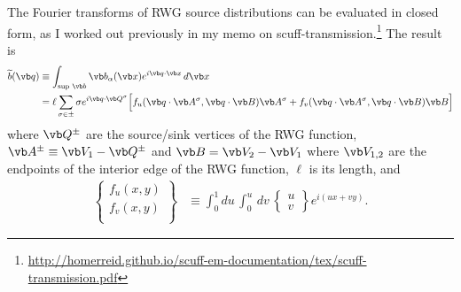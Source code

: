 \documentclass[letterpaper]{article}
\renewcommand{\wt}{\widetilde}
\begin{document}
The Fourier transforms of RWG source distributions can be evaluated
in closed form, as I worked out previously in my memo 
on {\sc scuff-transmission}.\footnote{\url{ http://homerreid.github.io/scuff-em-documentation/tex/scuff-transmission.pdf}}
The result is
\begin{align*}
 \wt{b}(\vb q)
&\equiv \int_{\text{sup }\vb b} \vb b_\alpha(\vb x) e^{i\vb q\cdot \vb x}\,d\vb x
\\
&=\ell\sum_{\sigma\in \pm}
  \sigma e^{i\vb q \cdot \vb Q^\sigma}
   \Big[  f_u(\vb q\cdot \vb A^\sigma, \vb q\cdot \vb B) \vb A^\sigma
         +f_v(\vb q\cdot \vb A^\sigma, \vb q\cdot \vb B) \vb B
   \Big]
\end{align*}
where $\vb Q^\pm$ are the source/sink vertices of the RWG function,
$\vb A^\pm\equiv \vb V_1-\vb Q^\pm$ and $\vb B=\vb V_2-\vb V_1$ 
where $\vb V_{1,2}$ are the endpoints of the interior edge
of the RWG function, $\ell$ is its length, and
\begin{align*}
 \left\{\begin{array}{c}
 f_u(x,y) \\[3pt]
 f_v(x,y) \\
 \end{array}\right\}
&\equiv 
 \int_0^1 du \, \int_0^u \, dv \,
  \left\{\begin{array}{c} u\\[3pt] v \end{array}\right\}
  e^{i(ux + vy)}.
\end{align*}
\end{document}
